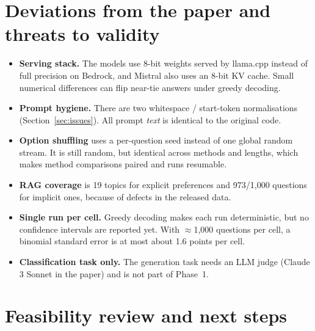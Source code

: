 \documentclass[11pt,a4paper]{article}
\begin{document}
\section{Deviations from the paper and threats to validity}

\begin{itemize}
  \item \textbf{Serving stack.} The models use 8-bit weights served by llama.cpp instead of full precision on Bedrock, and Mistral also uses an 8-bit KV cache.
        Small numerical differences can flip near-tie answers under greedy decoding.
  \item \textbf{Prompt hygiene.} There are two whitespace / start-token normalisations (Section~\ref{sec:issues}). All prompt \emph{text} is identical to the
        original code.
  \item \textbf{Option shuffling} uses a per-question seed instead of one global random stream. It is still random, but identical
        across methods and lengths, which makes method comparisons paired and runs resumable.
  \item \textbf{RAG coverage} is 19 topics for explicit preferences and 973/1{,}000 questions for implicit ones, because of defects in the released data.
  \item \textbf{Single run per cell.} Greedy decoding makes each run deterministic, but no confidence intervals are reported yet.
        With $\approx$1{,}000 questions per cell, a binomial standard error is at most about 1.6 points per cell.
  \item \textbf{Classification task only.} The generation task needs an LLM judge (Claude 3 Sonnet in the paper) and is not part of
        Phase~1.
\end{itemize}

\section{Feasibility review and next steps}\label{sec:next}
\end{document}
